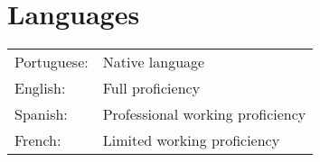 \documentclass[10pt]{article}
\begin{document}
\vspace{.5cm}
\section*{Languages}
\vspace{.3cm}
\begin{tabular}{l l}
Portuguese: & Native language\\[3pt]
English:& Full proficiency\\[3pt] 
Spanish: & Professional working proficiency \\[3pt]
French:& Limited working proficiency \\
\end{tabular}
\vspace{.5cm}

\vspace{.3cm}

\end{document}
